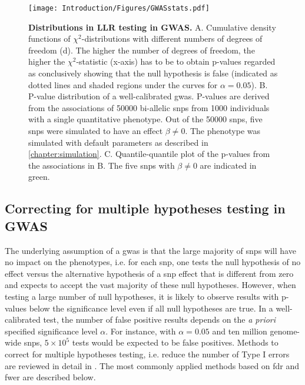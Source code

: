 \begin{figure}[hbtp]
	\centering
	\texttt{[image: Introduction/Figures/GWASstats.pdf]}
	\caption[\textbf{Distributions in LLR testing in GWAS.}]{\textbf{Distributions in LLR testing in GWAS. }A. Cumulative density functions of \(\chi^2\)-distributions with different numbers of degrees of freedom (d). The higher the number of degrees of freedom, the higher the \(\chi^2\)-statistic (x-axis) has to be to obtain p-values regarded as conclusively showing that the null hypothesis is false (indicated as dotted lines and shaded regions under the curves for \(\alpha=0.05\)). B. P-value distribution of a well-calibrated \gls{gwas}. P-values are derived from the associations of \num{50000} bi-allelic \glspl{snp} from \num{1000} individuals with a single quantitative phenotype. Out of the \num{50000} \glspl{snp}, five \glspl{snp} were simulated to have an effect \(\beta \neq 0\). The phenotype was simulated with default parameters as described in \cref{chapter:simulation}.  C. Quantile-quantile plot of the p-values from the associations in B. The five \glspl{snp} with \(\beta \neq 0\) are indicated in green.}
	 	\label{fig:GWAS-stats}
\end{figure}

\subsection{Correcting for multiple hypotheses testing in GWAS}
\label{subsection:multiple-testing}
The underlying assumption of a \gls{gwas} is that the large majority of \glspl{snp} will have no impact on the phenotypes, i.e. for each \gls{snp}, one tests the null hypothesis of no effect versus the alternative hypothesis of a \gls{snp} effect that is different from zero and expects to accept the vast majority of these null hypotheses. However, when testing a large number of null hypotheses, it is likely to observe results with p-values below the significance level even if all null hypotheses are true. In a well-calibrated test, the number of false positive results depends on the \textit{a priori} specified significance level \(\alpha\). For instance, with  \(\alpha=0.05\) and ten million genome-wide \glspl{snp}, \(5 \times 10^5\) tests would be expected to be false positives. Methods to correct for multiple hypotheses testing, i.e. reduce the number of Type I errors are reviewed in detail in \citep{Shaffer1995}. The most commonly applied methods based on \gls{fdr} and \gls{fwer} are described below.

